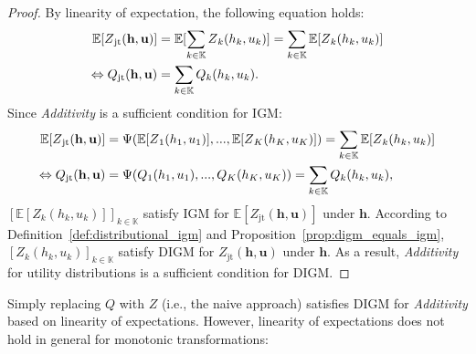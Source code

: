 \documentclass[twoside,11pt]{article}
\newcommand{\jointaction}{\mathbf{u}}
\newcommand{\action}{u}
\newcommand{\jointobservationhistory}{\mathbf{h}}
\newcommand{\observationhistory}{h}
\newcommand{\agentspace}{\mathbb{K}}
\newcommand{\agentcounter}{k}
\newcommand{\numberofagents}{K}
\newcommand{\utilityexp}{Q}
\newcommand{\utility}{Z}
\newcommand{\joint}{\mathrm{jt}}
\newcommand{\meandecompositionfunction}{\Psi}
\newcommand{\additivity}{\textit{Additivity}}
\newcommand{\digm}{DIGM}
\begin{document}
\begin{proof}
By linearity of expectation, the following equation holds:
\begin{equation}
\begin{aligned}
\mathbb{E}[\utility{}_{\joint{}}(\jointobservationhistory{},{\jointaction{}})]
&= \mathbb{E}[\sum_{\agentcounter{}\in\agentspace{}} \utility{}_{\agentcounter{}}(\observationhistory{}_{\agentcounter{}},\action{}_{\agentcounter{}})] = \sum_{\agentcounter{}\in\agentspace{}} \mathbb{E}[\utility{}_{\agentcounter{}}(\observationhistory{}_{\agentcounter{}},\action{}_{\agentcounter{}})] \\
\Leftrightarrow \utilityexp{}_{\joint{}}(\jointobservationhistory{},{\jointaction{}}) &= \sum_{\agentcounter{}\in\agentspace{}} \utilityexp{}_{\agentcounter{}}(\observationhistory{}_{\agentcounter{}},\action{}_{\agentcounter{}}).
\end{aligned}
\notag{}
\end{equation}
Since \additivity{} is a sufficient condition for IGM:
\begin{equation}
\begin{split}
\mathbb{E}[\utility{}_{\joint{}}(\jointobservationhistory{},{\jointaction{}})] &= \meandecompositionfunction{}(\mathbb{E}[\utility{}_1(\observationhistory{}_1,\action{}_1)], ..., \mathbb{E}[\utility{}_\numberofagents(\observationhistory{}_\numberofagents,\action{}_\numberofagents)]) = \sum_{\agentcounter{}\in\agentspace{}} \mathbb{E}[\utility{}_{\agentcounter{}}(\observationhistory{}_{\agentcounter{}},\action{}_{\agentcounter{}})] \\
\Leftrightarrow \utilityexp{}_{\joint{}}(\jointobservationhistory{},{\jointaction{}}) &= \meandecompositionfunction{}(\utilityexp{}_1(\observationhistory{}_1,\action{}_1), ..., \utilityexp{}_\numberofagents(\observationhistory{}_\numberofagents,\action{}_\numberofagents)) = \sum_{\agentcounter{}\in\agentspace{}} \utilityexp{}_{\agentcounter{}}(\observationhistory{}_{\agentcounter{}},\action{}_{\agentcounter{}}),
\end{split}
\notag{}
\end{equation}
$[\mathbb{E}[\utility_{\agentcounter}(\observationhistory_{\agentcounter}, u_{\agentcounter})]]_{\agentcounter \in \agentspace}$ satisfy IGM for $\mathbb{E}[\utility_{\joint}(\jointobservationhistory, \jointaction{})]$ under $\jointobservationhistory$. According to Definition~\ref{def:distributional_igm} and Proposition~\ref{prop:digm_equals_igm}, $[\utility_{\agentcounter}(\observationhistory_{\agentcounter}, u_{\agentcounter})]_{\agentcounter \in \agentspace}$ satisfy \digm{} for $\utility_{\joint}(\jointobservationhistory, \jointaction{})$ under $\jointobservationhistory$.
As a result, \additivity{} for utility distributions is a sufficient condition for \digm{}.
\end{proof} Simply replacing $\utilityexp$ with $\utility$ (i.e., the naive approach) satisfies \digm{} for \additivity{} based on linearity of expectations. However, linearity of expectations does not hold in general for monotonic transformations:
\end{document}

